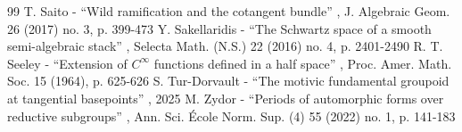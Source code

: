 \documentclass[10pt]{amsart}
\theoremstyle{definition}
\theoremstyle{remark}
\begin{document}
\begin{thebibliography}{99}
 T. Saito - “Wild ramification and the cotangent bundle” , J. Algebraic Geom. 26 (2017) no. 3, p. 399-473
 Y. Sakellaridis - “The Schwartz space of a smooth semi-algebraic stack” , Selecta Math. (N.S.) 22 (2016) no. 4, p. 2401-2490
 R. T. Seeley - “Extension of $C^{\infty }$ functions defined in a half space” , Proc. Amer. Math. Soc. 15 (1964), p. 625-626
 S. Tur-Dorvault - “The motivic fundamental groupoid at tangential basepoints” , 2025
 M. Zydor - “Periods of automorphic forms over reductive subgroups” , Ann. Sci. École Norm. Sup. (4) 55 (2022) no. 1, p. 141-183
\end{thebibliography}
\end{document}
